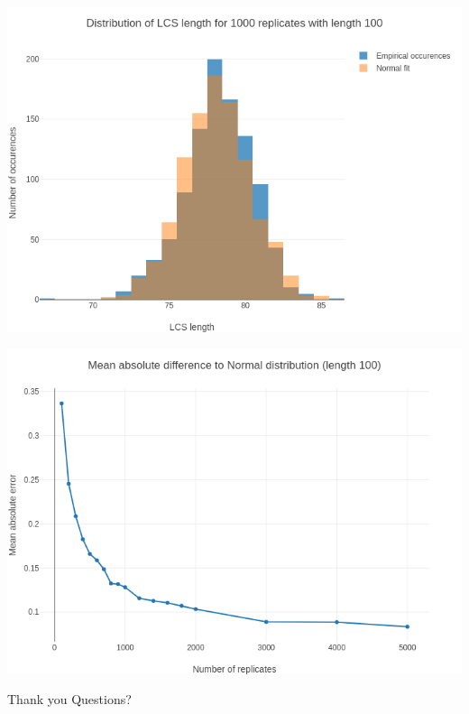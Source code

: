 \documentclass{beamer}
\begin{document}
\begin{frame}
  \includegraphics[width=\textwidth]{img/comparison_normal_rep1000.png}
\end{frame}

\begin{frame}
  \includegraphics[width=\textwidth]{img/diff_to_normal.png}
\end{frame}

\begin{frame}[standout]
  Thank you
  \vfill
  Questions?
  \vfill
\end{frame}
\end{document}
